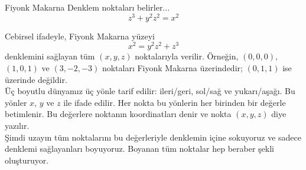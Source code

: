 \begin{surferPage}{Fiyonk Makarna}
Denklem noktaları belirler...\\
  
  \smallskip
\[z^3+ y^2	z^2	= x^2\]

\singlespacing
Cebirsel ifadeyle, Fiyonk Makarna yüzeyi
\smallskip
\[ x^2= y^2z^2+z^3\]
\smallskip
denklemini sağlayan tüm  $(x, y, z)$ noktalarıyla verilir. Örneğin, $(0,0,0),$ $(1,0,1)$ ve $(3,-2,-3)$ noktaları Fiyonk Makarna üzerindedir;  $(0,1,1)$ ise üzerinde değildir.\\
 \singlespacing
Üç boyutlu dünyamız üç yönle tarif edilir: ileri/geri, sol/sağ ve yukarı/aşağı. Bu yönler  $x$, $y$ ve $z$ ile ifade edilir. Her nokta bu yönlerin her birinden bir değerle betimlenir. Bu değerlere noktanın koordinatları denir ve nokta $(x,y,z)$ diye yazılır.\\
\singlespacing
Şimdi uzayın tüm noktalarını bu değerleriyle denklemin içine sokuyoruz ve sadece denklemi sağlayanları boyuyoruz. Boyanan tüm noktalar hep beraber şekli oluşturuyor.
\end{surferPage}
